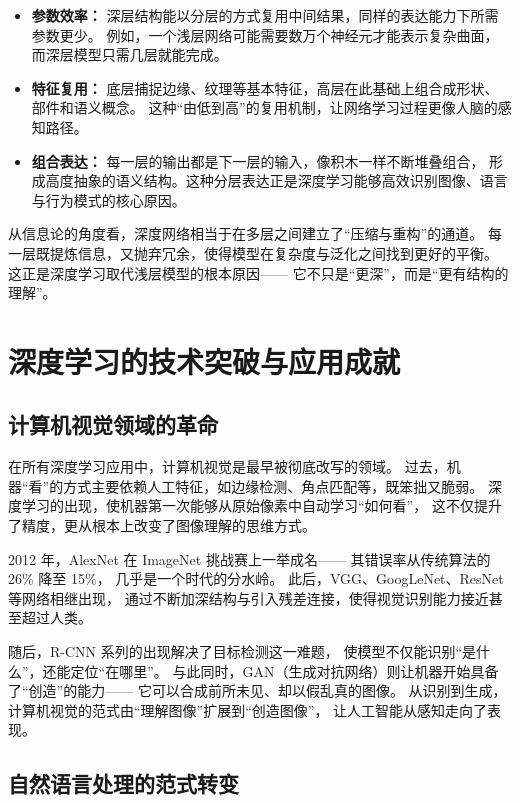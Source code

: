 \begin{itemize}
\item {\bf 参数效率：} 深层结构能以分层的方式复用中间结果，同样的表达能力下所需参数更少。  
例如，一个浅层网络可能需要数万个神经元才能表示复杂曲面，而深层模型只需几层就能完成。
\item {\bf 特征复用：} 底层捕捉边缘、纹理等基本特征，高层在此基础上组合成形状、部件和语义概念。  
这种“由低到高”的复用机制，让网络学习过程更像人脑的感知路径。
\item {\bf 组合表达：} 每一层的输出都是下一层的输入，像积木一样不断堆叠组合，  
形成高度抽象的语义结构。这种分层表达正是深度学习能够高效识别图像、语言与行为模式的核心原因。
\end{itemize}

从信息论的角度看，深度网络相当于在多层之间建立了“压缩与重构”的通道。  
每一层既提炼信息，又抛弃冗余，使得模型在复杂度与泛化之间找到更好的平衡。  
这正是深度学习取代浅层模型的根本原因——  
它不只是“更深”，而是“更有结构的理解”。

\section{深度学习的技术突破与应用成就}

\subsection{计算机视觉领域的革命}

在所有深度学习应用中，计算机视觉是最早被彻底改写的领域。  
过去，机器“看”的方式主要依赖人工特征，如边缘检测、角点匹配等，既笨拙又脆弱。  
深度学习的出现，使机器第一次能够从原始像素中自动学习“如何看”，  
这不仅提升了精度，更从根本上改变了图像理解的思维方式。  

2012 年，AlexNet 在 ImageNet 挑战赛上一举成名——  
其错误率从传统算法的 26\% 降至 15\%，  
几乎是一个时代的分水岭。  
此后，VGG、GoogLeNet、ResNet 等网络相继出现，  
通过不断加深结构与引入残差连接，使得视觉识别能力接近甚至超过人类。  

随后，R-CNN 系列的出现解决了目标检测这一难题，  
使模型不仅能识别“是什么”，还能定位“在哪里”。  
与此同时，GAN（生成对抗网络）则让机器开始具备了“创造”的能力——  
它可以合成前所未见、却以假乱真的图像。  
从识别到生成，计算机视觉的范式由“理解图像”扩展到“创造图像”，  
让人工智能从感知走向了表现。

\subsection{自然语言处理的范式转变}

